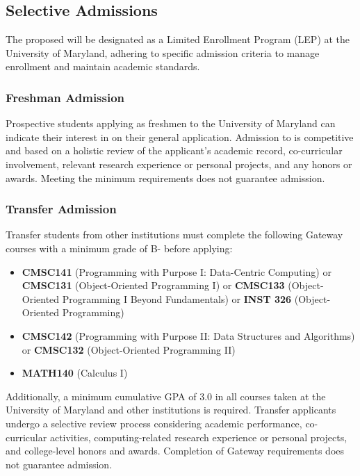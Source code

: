 \subsection{Selective Admissions}

The proposed \name{} will be designated as a Limited Enrollment Program (LEP) at the University of Maryland, adhering to specific admission criteria to manage enrollment and maintain academic standards.

\subsubsection*{Freshman Admission}
Prospective students applying as freshmen to the University of Maryland can indicate their interest in \name{} on their general application. Admission to \short{} is competitive and based on a holistic review of the applicant's academic record, co-curricular involvement, relevant research experience or personal projects, and any honors or awards. Meeting the minimum requirements does not guarantee admission.

\subsubsection*{Transfer Admission}
Transfer students from other institutions must complete the following Gateway courses with a minimum grade of B- before applying:
\begin{itemize}
    \item \textbf{CMSC141} (Programming with Purpose I: Data-Centric Computing) or \textbf{CMSC131} (Object-Oriented Programming I) or \textbf{CMSC133} (Object-Oriented Programming I Beyond Fundamentals) or \textbf{INST 326} (Object-Oriented Programming)
    \item \textbf{CMSC142} (Programming with Purpose II: Data Structures and Algorithms) or \textbf{CMSC132} (Object-Oriented Programming II)
    \item \textbf{MATH140} (Calculus I) 
\end{itemize}

Additionally, a minimum cumulative GPA of 3.0 in all courses taken at the University of Maryland and other institutions is required. Transfer applicants undergo a selective review process considering academic performance, co-curricular activities, computing-related research experience or personal projects, and college-level honors and awards. Completion of Gateway requirements does not guarantee admission.

